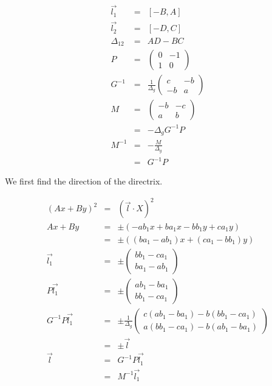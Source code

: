 \documentclass{article}
\begin{document}
\begin{eqnarray}
\vec{l_1} & = & [-B, A]\\
\vec{l_2} & = & [-D, C]\\
\Delta_{12} & = & AD - BC\\
P & = & \left(\begin{array}{cc} 0 & -1 \\ 1 & 0 \end{array}\right)\\
G^{-1} & = & \frac{1}{\Delta_g}\left(\begin{array}{cc} c & -b \\ -b & a \end{array}\right)\\
M & = & \left(\begin{array}{cc} -b & -c  \\ a & b  \end{array}\right)\\
  & = & -\Delta_gG^{-1}{P}\\
M^{-1} & = & -\frac{M}{\Delta_g}\\
       & = & G^{-1}P
\end{eqnarray}

We first find the direction of the directrix.

\begin{eqnarray}
(Ax + By)^2 & = & (\vec{l}\cdot X)^2\\
Ax + By     & = & \pm(-ab_1x + ba_1x - bb_1y + ca_1y)\\
            & = & \pm((ba_1 - ab_1)x + (ca_1 - bb_1)y)\\
\vec{l_1}   & = & \pm\left(\begin{array}{c} bb_1 - ca_1 \\ ba_1 - ab_1\end{array}\right)\\
P\vec{l_1} & = & \pm\left(\begin{array}{c}  ab_1 - ba_1 \\ bb_1 - ca_1  \end{array}\right)\\
G^{-1}P\vec{l_1} & = & \pm\frac{1}{\Delta_g}\left(\begin{array}{c} c(ab_1 - ba_1) - b(bb_1 - ca_1)  \\ a(bb_1 - ca_1) - b(ab_1 - ba_1)  \end{array}\right)\\
 & = & \pm\vec{l}\\
\vec{l} & = & G^{-1}P\vec{l_1}\\
        & = & M^{-1}\vec{l_1}
\end{eqnarray}
\end{document}
